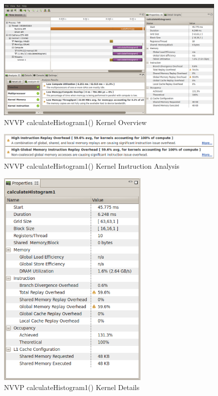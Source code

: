 \documentclass{article}
\begin{document}
\begin{figure}
\centering
\includegraphics[width=1.0\textwidth]{screenshots/nvvp/calculateHistogram1_screen1.png}
\caption{NVVP calculateHistogram1() Kernel Overview }
\label{kernel1nvvp1}
\end{figure}

\begin{figure}
\centering
\includegraphics[width=1.0\textwidth]{screenshots/nvvp/calculateHistogram1_screen2.png}
\caption{NVVP calculateHistogram1() Kernel Instruction Analysis}
\label{kernel1nvvp2}
\end{figure}

\begin{figure}
\centering
\includegraphics[width=0.65\textwidth]{screenshots/nvvp/calculateHistogram1_screen3.png}
\caption{NVVP calculateHistogram1() Kernel Details}
\label{kernel1nvvp3}
\end{figure}
\end{document}
